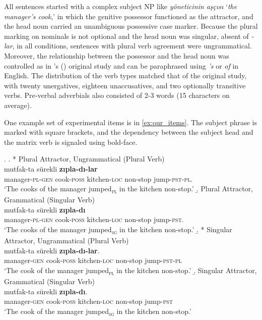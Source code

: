 \documentclass[brill,linguex]{glossa}\usepackage[]{graphicx}\usepackage[]{color}
\begin{document}
All sentences started with a complex subject NP like \textit{y\"{o}neticinin a\c{s}\c{c}{\i}s{\i}} `\textit{the manager's cook},' in which the genitive possessor functioned as the attractor, and the head noun carried an unambiguous possessive case marker. Because the plural marking on nominals is not optional and the head noun was singular, absent of \textit{-lar}, in all conditions, sentences with plural verb agreement were ungrammatical. Moreover, the relationship between the possessor and the head noun was controlled as in \citeauthor{LagoEtAl:2019}'s (\citeyear{LagoEtAl:2019}) original study and can be paraphrased using \textit{'s} or \textit{of} in English. The distribution of the verb types matched that of the original study, with twenty unergatives, eighteen unaccusatives, and two optionally transitive verbs. Pre-verbal adverbials also consisted of 2-3 words (15 characters on average).

One example set of experimental items is in \ref{ex:our_items}. The subject phrase is marked with square brackets, and the dependency between the subject head and the matrix verb is signaled using bold-face.


\ex. \label{ex:our_items}
  \a. * Plural Attractor, Ungrammatical (Plural Verb) \label{ex:expitem-plpl}\\
   mutfak-ta s\"{u}rekli \textbf{z{\i}pla-d{\i}-lar}\\ 
  manager-\textsc{pl}-\textsc{gen}  cook-\textsc{poss} kitchen-\textsc{loc} non-stop  jump-\textsc{pst}-\textsc{pl}.\\
  \glt `The cooks of the manager jumped\textsubscript{\textsc{pl}} in the kitchen non-stop.'
  \b. Plural Attractor, Grammatical (Singular Verb) \label{ex:expitem-plsg} \\
   mutfak-ta s\"{u}rekli \textbf{z{\i}pla-d{\i}}\\ 
  manager-\textsc{pl}-\textsc{gen}  cook-\textsc{poss} kitchen-\textsc{loc} non-stop  jump-\textsc{pst}.\\
  \glt `The cooks of the manager jumped\textsubscript{\textsc{sg}} in the kitchen non-stop.'
  \b. * Singular Attractor, Ungrammatical (Plural Verb) \label{ex:expitem-sgpl}\\
   mutfak-ta s\"{u}rekli \textbf{z{\i}pla-d{\i}-lar}.\\ 
  manager-\textsc{gen}  cook-\textsc{poss} kitchen-\textsc{loc} non-stop  jump-\textsc{pst}-\textsc{pl}\\
  \glt `The cook of the manager jumped\textsubscript{\textsc{pl}} in the kitchen non-stop.'
  \b. Singular Attractor, Grammatical (Singular Verb) \label{ex:expitem-sgsg}\\
   mutfak-ta s\"{u}rekli \textbf{z{\i}pla-d{\i}}. \\ 
  manager-\textsc{gen}  cook-\textsc{poss} kitchen-\textsc{loc} non-stop  jump-\textsc{pst}\\
  \glt `The cook of the manager jumped\textsubscript{\textsc{sg}} in the kitchen non-stop.'
  
\end{document}
